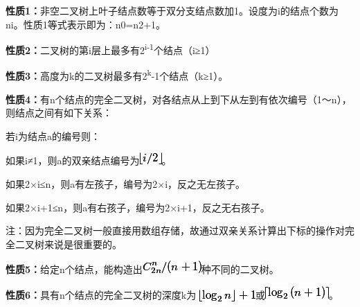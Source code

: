 \textbf{{性质}{1}{：}}非空二叉树上叶子结点数等于双分支结点数加1。设度为i的结点个数为ni。性质1等式表示即为：n0=n2+1。

\textbf{{性质}{2}{：}}二叉树的第i层上最多有2\textsuperscript{i-1}个结点（i≥1）

\textbf{{性质}{3}{：}}高度为k的二叉树最多有2\textsuperscript{k}-1个结点（k≥1）。

\textbf{{性质}{4}{：}}有n个结点的完全二叉树，对各结点从上到下从左到有依次编号（1～n），则结点之间有如下关系：

若i为结点a的编号则：

如果i≠1，则a的双亲结点编号为\includegraphics[width=0.33333in,height=0.17708in]{texmath/18cb1elfloori2rfloor}。

如果2×i≤n，则a有左孩子，编号为2×i，反之无左孩子。

如果2×i+1≤n，则a有右孩子，编号为2×i+1，反之无右孩子。

注：因为完全二叉树一般直接用数组存储，故通过双亲关系计算出下标的操作对完全二叉树来说是很重要的。

\textbf{{性质}{5}{：}}给定{n}个结点，能构造出\includegraphics[width=0.88542in,height=0.18750in]{texmath/3fa64cC2nn(n+1)}{种}不同的二叉树。

\textbf{{性质}{6}{：}}具有{n}个结点的完全二叉树的深度{k}为
\textsubscript{\includegraphics[width=0.84375in,height=0.17708in]{texmath/d2f760lfloorloglimitsrm2nrfloor+1}}或\includegraphics[width=0.95833in,height=0.18750in]{texmath/417732lceilloglimitsrm2(n+1)rceil}。
